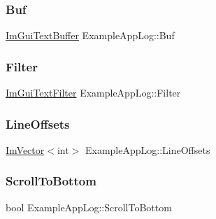 \subsubsection{\texorpdfstring{Buf}{Buf}}
{\footnotesize\ttfamily \hyperlink{struct_im_gui_text_buffer}{Im\+Gui\+Text\+Buffer} Example\+App\+Log\+::\+Buf}

\hypertarget{struct_example_app_log_a4571947a6000e984ec8da9b7166e1e2b}{}\label{struct_example_app_log_a4571947a6000e984ec8da9b7166e1e2b} 
\subsubsection{\texorpdfstring{Filter}{Filter}}
{\footnotesize\ttfamily \hyperlink{struct_im_gui_text_filter}{Im\+Gui\+Text\+Filter} Example\+App\+Log\+::\+Filter}

\hypertarget{struct_example_app_log_af197fca7116f9033a5a5e831ee764ee2}{}\label{struct_example_app_log_af197fca7116f9033a5a5e831ee764ee2} 
\subsubsection{\texorpdfstring{Line\+Offsets}{LineOffsets}}
{\footnotesize\ttfamily \hyperlink{class_im_vector}{Im\+Vector}$<$int$>$ Example\+App\+Log\+::\+Line\+Offsets}

\hypertarget{struct_example_app_log_a6834b71563c0595e67b78afb6c7ce39d}{}\label{struct_example_app_log_a6834b71563c0595e67b78afb6c7ce39d} 
\subsubsection{\texorpdfstring{Scroll\+To\+Bottom}{ScrollToBottom}}
{\footnotesize\ttfamily bool Example\+App\+Log\+::\+Scroll\+To\+Bottom}

